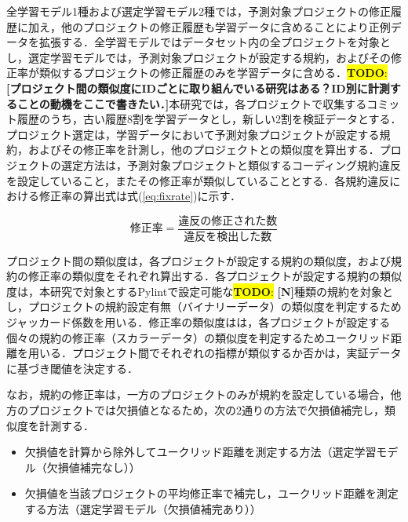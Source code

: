 \documentclass[submit]{ipsj}
\newcommand{\todo}[1]{\colorbox{yellow}{{\bf TODO}:}{\color{red} {\textbf{[#1]}}}}
\begin{document}
全学習モデル1種および選定学習モデル2種では，予測対象プロジェクトの修正履歴に加え，他のプロジェクトの修正履歴も学習データに含めることにより正例データを拡張する．全学習モデルではデータセット内の全プロジェクトを対象とし，選定学習モデルでは，予測対象プロジェクトが設定する規約，およびその修正率が類似するプロジェクトの修正履歴のみを学習データに含める．\todo{プロジェクト間の類似度にIDごとに取り組んでいる研究はある？ID別に計測することの動機をここで書きたい．}本研究では，各プロジェクトで収集するコミット履歴のうち，古い履歴8割を学習データとし，新しい2割を検証データとする．プロジェクト選定は，学習データにおいて予測対象プロジェクトが設定する規約，およびその修正率を計測し，他のプロジェクトとの類似度を算出する．プロジェクトの選定方法は，予測対象プロジェクトと類似するコーディング規約違反を設定していること，またその修正率が類似していることとする．各規約違反における修正率の算出式は式(\ref{eq:fixrate})に示す．

\begin{equation}
\label{eq:fixrate}
\text{修正率} = \frac{\text{違反の修正された数}}{\text{違反を検出した数}}
\end{equation}

プロジェクト間の類似度は，各プロジェクトが設定する規約の類似度，および規約の修正率の類似度をそれぞれ算出する．各プロジェクトが設定する規約の類似度は，本研究で対象とするPylintで設定可能な\todo{N}種類の規約を対象とし，プロジェクトの規約設定有無（バイナリーデータ）の類似度を判定するためジャッカード係数を用いる．修正率の類似度はは，各プロジェクトが設定する個々の規約の修正率（スカラーデータ）の類似度を判定するためユークリッド距離を用いる．プロジェクト間でそれぞれの指標が類似するか否かは，実証データに基づき閾値を決定する．

なお，規約の修正率は，一方のプロジェクトのみが規約を設定している場合，他方のプロジェクトでは欠損値となるため，次の2通りの方法で欠損値補完し，類似度を計測する．

\begin{itemize}
    \item 欠損値を計算から除外してユークリッド距離を測定する方法（選定学習モデル（欠損値補完なし））
    \item 欠損値を当該プロジェクトの平均修正率で補完し，ユークリッド距離を測定する方法（選定学習モデル（欠損値補完あり））
\end{itemize}
\end{document}
